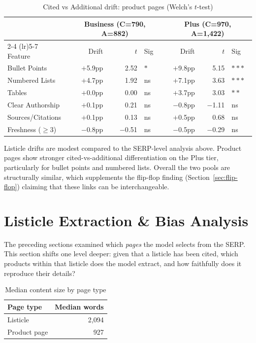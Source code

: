 \begin{table}[H]
\centering
\caption{Cited vs Additional drift: product pages (Welch's $t$-test)}
\label{tab:ttest-cited-addl-pp}
\begin{tabular}{lrrlrrl}
\toprule
 & \multicolumn{3}{c}{Business (C=790, A=882)} & \multicolumn{3}{c}{Plus (C=970, A=1{,}422)} \\
\cmidrule(lr){2-4} \cmidrule(lr){5-7}
Feature & Drift & $t$ & Sig & Drift & $t$ & Sig \\
\midrule
Bullet Points   & $+$5.9pp & 2.52 & $*$       & $+$9.8pp & 5.15 & $***$ \\
Numbered Lists  & $+$4.7pp & 1.92 & ns        & $+$7.1pp & 3.63 & $***$ \\
Tables          & $+$0.0pp & 0.00 & ns         & $+$3.7pp & 3.03 & $**$  \\
Clear Authorship& $+$0.1pp & 0.21 & ns         & $-$0.8pp & $-$1.11 & ns \\
Sources/Citations& $+$0.1pp & 0.13 & ns        & $+$0.5pp & 0.68 & ns   \\
Freshness ($\geq$3) & $-$0.8pp & $-$0.51 & ns & $-$0.5pp & $-$0.29 & ns \\
\bottomrule
\end{tabular}
\end{table}

Listicle drifts are modest compared to the SERP-level analysis above. 
Product pages show stronger cited-vs-additional differentiation on the Plus 
tier, particularly for bullet points and numbered lists. Overall the two pools 
are structurally similar, which supplements the flip-flop finding (Section~\ref{sec:flip-flop}) claiming that these links can be interchangeable.

\section{Listicle Extraction \& Bias Analysis}
\label{sec:listicle-bias}

The preceding sections examined which \emph{pages} the model selects from the SERP.
This section shifts one level deeper: given that a listicle has been cited,
which products within that listicle does the model extract, and how faithfully
does it reproduce their details?

\begin{table}[H]
\centering
\caption{Median content size by page type}
\label{tab:content-size}
\label{sec:content-size}
\begin{tabular}{lr}
\toprule
Page type & Median words \\
\midrule
Listicle & 2{,}094 \\
Product page & 927 \\
\bottomrule
\end{tabular}
\end{table}

